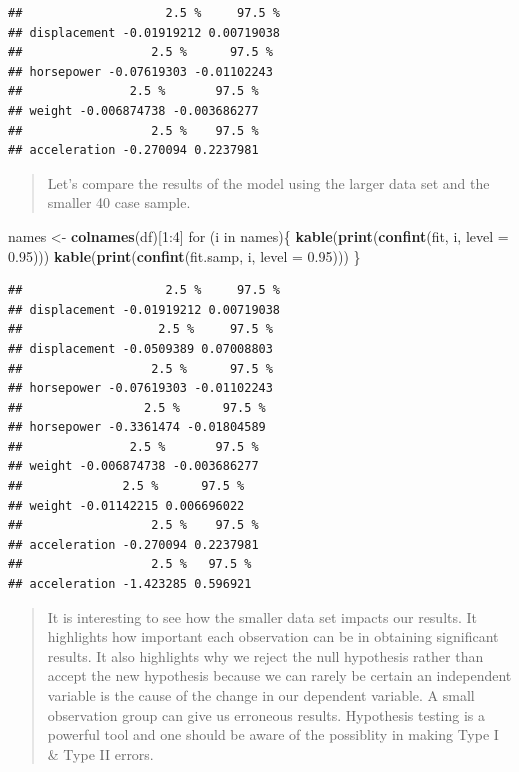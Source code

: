 \documentclass[]{article}
\newenvironment{Shaded}{\begin{snugshade}}{\end{snugshade}}
\newcommand{\KeywordTok}[1]{\textcolor[rgb]{0.13,0.29,0.53}{\textbf{{#1}}}}
\newcommand{\DataTypeTok}[1]{\textcolor[rgb]{0.13,0.29,0.53}{{#1}}}
\newcommand{\DecValTok}[1]{\textcolor[rgb]{0.00,0.00,0.81}{{#1}}}
\newcommand{\FloatTok}[1]{\textcolor[rgb]{0.00,0.00,0.81}{{#1}}}
\newcommand{\StringTok}[1]{\textcolor[rgb]{0.31,0.60,0.02}{{#1}}}
\newcommand{\NormalTok}[1]{{#1}}
\begin{document}
\begin{verbatim}
##                    2.5 %     97.5 %
## displacement -0.01919212 0.00719038
##                  2.5 %      97.5 %
## horsepower -0.07619303 -0.01102243
##               2.5 %       97.5 %
## weight -0.006874738 -0.003686277
##                  2.5 %    97.5 %
## acceleration -0.270094 0.2237981
\end{verbatim}

\newpage

\begin{quote}
Let's compare the results of the model using the larger data set and the
smaller 40 case sample.
\end{quote}

\begin{Shaded}
\begin{Highlighting}[]
\NormalTok{names <-}\StringTok{ }\KeywordTok{colnames}\NormalTok{(df)[}\DecValTok{1}\NormalTok{:}\DecValTok{4}\NormalTok{]}
\NormalTok{for (i in names)\{}
\KeywordTok{kable}\NormalTok{(}\KeywordTok{print}\NormalTok{(}\KeywordTok{confint}\NormalTok{(fit, i, }\DataTypeTok{level =} \FloatTok{0.95}\NormalTok{)))}
\KeywordTok{kable}\NormalTok{(}\KeywordTok{print}\NormalTok{(}\KeywordTok{confint}\NormalTok{(fit.samp, i, }\DataTypeTok{level =} \FloatTok{0.95}\NormalTok{)))}
\NormalTok{\}}
\end{Highlighting}
\end{Shaded}

\begin{verbatim}
##                    2.5 %     97.5 %
## displacement -0.01919212 0.00719038
##                   2.5 %     97.5 %
## displacement -0.0509389 0.07008803
##                  2.5 %      97.5 %
## horsepower -0.07619303 -0.01102243
##                 2.5 %      97.5 %
## horsepower -0.3361474 -0.01804589
##               2.5 %       97.5 %
## weight -0.006874738 -0.003686277
##              2.5 %      97.5 %
## weight -0.01142215 0.006696022
##                  2.5 %    97.5 %
## acceleration -0.270094 0.2237981
##                  2.5 %   97.5 %
## acceleration -1.423285 0.596921
\end{verbatim}

\begin{quote}
It is interesting to see how the smaller data set impacts our results.
It highlights how important each observation can be in obtaining
significant results. It also highlights why we reject the null
hypothesis rather than accept the new hypothesis because we can rarely
be certain an independent variable is the cause of the change in our
dependent variable. A small observation group can give us erroneous
results. Hypothesis testing is a powerful tool and one should be aware
of the possiblity in making Type I \& Type II errors.
\end{quote}
\end{document}
